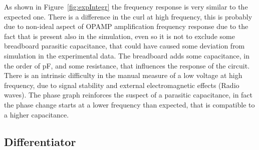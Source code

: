 \documentclass[a4paper, twocolumn]{article}
\begin{document}

As shown in Figure~\ref{fig:expIntegr} the frequency response is very similar to the expected one. There is a difference in the curl at high frequency, this is probably due to non-ideal aspect of OPAMP amplification frequency response due to the fact that is present also in the simulation, even so it is not to exclude some breadboard parasitic capacitance, that could have caused some deviation from simulation in the experimental data. The breadboard adds some capacitance, in the order of \unit{\pico\farad}, and some resistance, that influences the response of the circuit. There is an intrinsic difficulty in the manual measure of a low voltage at high frequency, due to signal stability and external electromagnetic effects (Radio waves). The phase graph reinforces the suspect of a parasitic capacitance, in fact the phase change starts at a lower frequency than expected, that is compatible to a higher capacitance.

\subsection{Differentiator}
\end{document}
